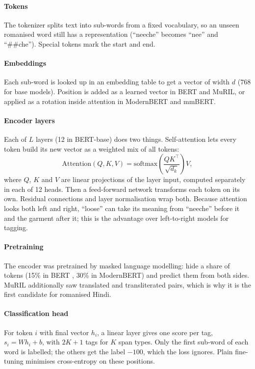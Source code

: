 \paragraph{Tokens} The tokenizer splits text into sub-words from a fixed vocabulary, so an unseen romanised word still has a representation (``neeche'' becomes ``nee'' and ``\#\#che''). Special tokens mark the start and end.

\paragraph{Embeddings} Each sub-word is looked up in an embedding table to get a vector of width $d$ (768 for base models). Position is added as a learned vector in BERT and MuRIL, or applied as a rotation inside attention in ModernBERT and mmBERT.

\paragraph{Encoder layers} Each of $L$ layers (12 in BERT-base) does two things. Self-attention lets every token build its new vector as a weighted mix of all tokens:
\begin{equation}
\mathrm{Attention}(Q,K,V) = \mathrm{softmax}\!\left(\frac{QK^{\top}}{\sqrt{d_k}}\right)V,
\end{equation}
where $Q$, $K$ and $V$ are linear projections of the layer input, computed separately in each of 12 heads. Then a feed-forward network transforms each token on its own. Residual connections and layer normalisation wrap both. Because attention looks both left and right, ``loose'' can take its meaning from ``neeche'' before it and the garment after it; this is the advantage over left-to-right models for tagging.

\paragraph{Pretraining} The encoder was pretrained by masked language modelling: hide a share of tokens (15\% in BERT \cite{devlin2019bert}, 30\% in ModernBERT) and predict them from both sides. MuRIL additionally saw translated and transliterated pairs, which is why it is the first candidate for romanised Hindi.

\paragraph{Classification head} For token $i$ with final vector $h_i$, a linear layer gives one score per tag, $s_i = W h_i + b$, with $2K+1$ tags for $K$ span types. Only the first sub-word of each word is labelled; the others get the label $-100$, which the loss ignores. Plain fine-tuning minimises cross-entropy on these positions.

